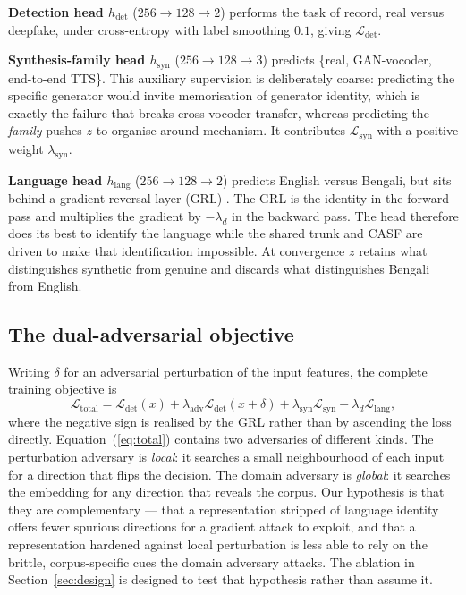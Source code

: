 \documentclass[conference]{IEEEtran}
\newcommand{\Loss}{\mathcal{L}}
\renewcommand{\cite}[1]{\unskip}
\begin{document}
\textbf{Detection head $h_{\mathrm{det}}$} ($256 \rightarrow 128
\rightarrow 2$) performs the task of record, real versus deepfake, under
cross-entropy with label smoothing $0.1$, giving $\Loss_{\mathrm{det}}$.

\textbf{Synthesis-family head $h_{\mathrm{syn}}$} ($256 \rightarrow 128
\rightarrow 3$) predicts \{real, GAN-vocoder, end-to-end TTS\}. This
auxiliary supervision is deliberately coarse: predicting the specific
generator would invite memorisation of generator identity, which is exactly
the failure that breaks cross-vocoder transfer, whereas predicting the
\emph{family} pushes $z$ to organise around mechanism. It contributes
$\Loss_{\mathrm{syn}}$ with a positive weight $\lambda_{\mathrm{syn}}$.

\textbf{Language head $h_{\mathrm{lang}}$} ($256 \rightarrow 128
\rightarrow 2$) predicts English versus Bengali, but sits behind a gradient
reversal layer (GRL) \cite{ganin2016dann}. The GRL is the identity in the
forward pass and multiplies the gradient by $-\lambda_d$ in the backward
pass. The head therefore does its best to identify the language while the
shared trunk and CASF are driven to make that identification impossible.
At convergence $z$ retains what distinguishes synthetic from genuine and
discards what distinguishes Bengali from English.

\subsection{The dual-adversarial objective}
Writing $\delta$ for an adversarial perturbation of the input features, the
complete training objective is
\begin{equation}
\label{eq:total}
\Loss_{\mathrm{total}} =
\Loss_{\mathrm{det}}(x)
+ \lambda_{\mathrm{adv}} \Loss_{\mathrm{det}}(x + \delta)
+ \lambda_{\mathrm{syn}} \Loss_{\mathrm{syn}}
- \lambda_{d} \Loss_{\mathrm{lang}} ,
\end{equation}
where the negative sign is realised by the GRL rather than by ascending the
loss directly. Equation~(\ref{eq:total}) contains two adversaries of
different kinds. The perturbation adversary is \emph{local}: it searches a
small neighbourhood of each input for a direction that flips the decision.
The domain adversary is \emph{global}: it searches the embedding for any
direction that reveals the corpus. Our hypothesis is that they are
complementary --- that a representation stripped of language identity
offers fewer spurious directions for a gradient attack to exploit, and that
a representation hardened against local perturbation is less able to rely
on the brittle, corpus-specific cues the domain adversary attacks. The
ablation in Section~\ref{sec:design} is designed to test that hypothesis
rather than assume it.
\end{document}
